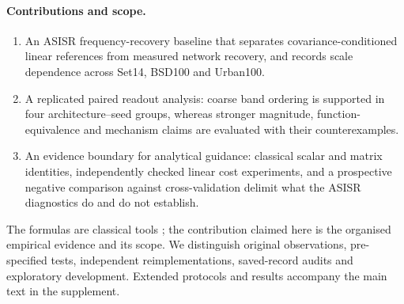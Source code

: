 \paragraph{Contributions and scope.}
\begin{enumerate}
\item An ASISR frequency-recovery baseline that separates covariance-conditioned linear references from measured network recovery, and records scale dependence across Set14, BSD100 and Urban100.
\item A replicated paired readout analysis: coarse band ordering is supported in four architecture--seed groups, whereas stronger magnitude, function-equivalence and mechanism claims are evaluated with their counterexamples.
\item An evidence boundary for analytical guidance: classical scalar and matrix identities, independently checked linear cost experiments, and a prospective negative comparison against cross-validation delimit what the ASISR diagnostics do and do not establish.
\end{enumerate}
The formulas are classical tools \citep{kay1993estimation,rasmussen2006gp}; the contribution claimed here is the organised empirical evidence and its scope. We distinguish original observations, pre-specified tests, independent reimplementations, saved-record audits and exploratory development. Extended protocols and results accompany the main text in the supplement.
